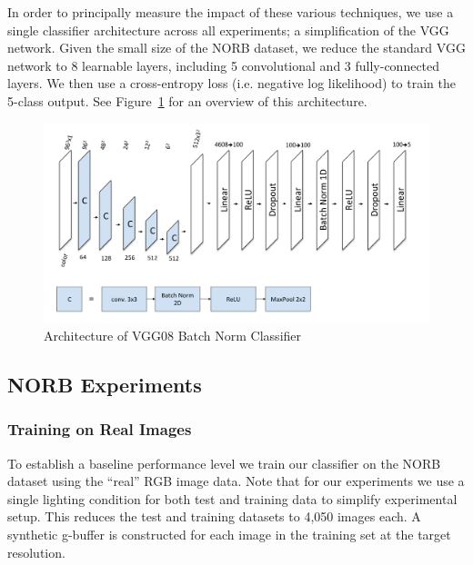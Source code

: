 \documentclass[10pt,twocolumn,letterpaper]{article}
\begin{document}
In order to principally measure the impact of these various techniques, we use a single classifier architecture across all experiments; a simplification of the VGG network\cite{DBLP:journals/corr/SimonyanZ14a}. Given the small size of the NORB dataset, we reduce the standard VGG network to 8 learnable layers, including 5 convolutional and 3 fully-connected layers. We then use a cross-entropy loss (i.e. negative log likelihood) to train the 5-class output. See 
Figure~\ref{fig:VGG_DAIGRAM} for an overview of this architecture.

\begin{figure}[h!]
\centering
\includegraphics[width=1.0\columnwidth]{./assets/vgg08_diagram.pdf}
\caption{Architecture of VGG08 Batch Norm Classifier}
\label{fig:VGG_DAIGRAM}
\end{figure}

\subsection{NORB Experiments}
\subsubsection{Training on Real Images}
To establish a baseline performance level we train our classifier on the NORB dataset using the ``real'' RGB image data. Note that for our experiments we use a single lighting condition for both test and training data to simplify experimental setup.  This reduces the test and training datasets to 4,050 images each.  A synthetic g-buffer is constructed for each image in the training set at the target resolution.
\end{document}
